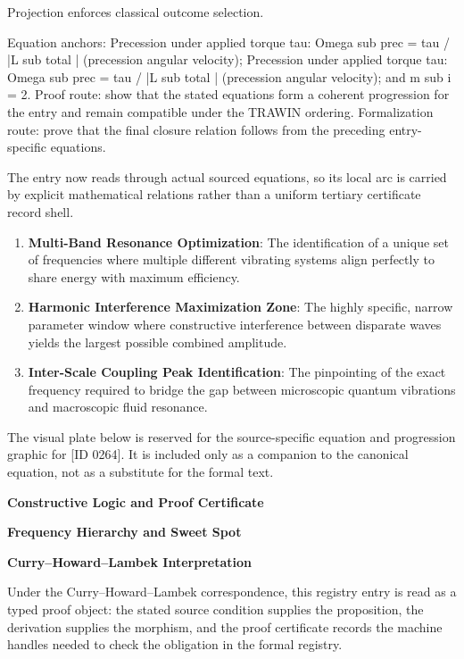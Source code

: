 Projection enforces classical outcome selection.

Equation anchors: Precession under applied torque tau: Omega sub prec = tau / |L sub total | (precession angular velocity); Precession under applied torque tau: Omega sub prec = tau / |L sub total | (precession angular velocity); and m sub i = 2. Proof route: show that the stated equations form a coherent progression for the entry and remain compatible under the TRAWIN ordering. Formalization route: prove that the final closure relation follows from the preceding entry-specific equations.

The entry now reads through actual sourced equations, so its local arc is carried by explicit mathematical relations rather than a uniform tertiary certificate record shell.
\endgroup

\begin{enumerate}[leftmargin=1.6em,itemsep=6pt,topsep=4pt]
\item \textbf{Multi-Band Resonance Optimization}: The identification of a unique set of frequencies where multiple different vibrating systems align perfectly to share energy with maximum efficiency.
\item \textbf{Harmonic Interference Maximization Zone}: The highly specific, narrow parameter window where constructive interference between disparate waves yields the largest possible combined amplitude.
\item \textbf{Inter-Scale Coupling Peak Identification}: The pinpointing of the exact frequency required to bridge the gap between microscopic quantum vibrations and macroscopic fluid resonance.
\end{enumerate}

\begingroup\footnotesize\sloppy
The visual plate below is reserved for the source-specific equation and progression graphic for [ID 0264]. It is included only as a companion to the canonical equation, not as a substitute for the formal text.
\par\endgroup
\ifTZPDarkEdition
{}
\fi

\clearpage
\begingroup\tzpsupportsetup
\noindent\textbf{\fontsize{10.8pt}{12.8pt}\selectfont [ID 0264] Constructive Logic and Proof Certificate}\par
\noindent\textbf{\fontsize{10pt}{12pt}\selectfont Frequency Hierarchy and Sweet Spot}\par
\vspace{0.45em}
\begingroup
\footnotesize
\setlength{\parskip}{0.22em}
\setlength{\parindent}{0pt}
\noindent\textbf{Curry--Howard--Lambek Interpretation}\par
Under the Curry--Howard--Lambek correspondence, this registry entry is read as a typed proof
object: the stated source condition supplies the proposition, the derivation supplies the
morphism, and the proof certificate records the machine handles needed to check the obligation
in the formal registry.

